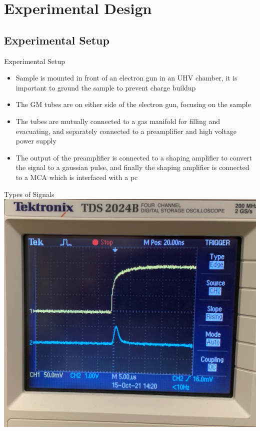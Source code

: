 \documentclass[12pt, aspectratio=169]{beamer}
\begin{document}
\section{Experimental Design}

\subsection{Experimental Setup}
\begin{frame}{Experimental Setup}
    \begin{itemize}
        \item Sample is mounted in front of an electron gun in an UHV chamber, it is important to ground the sample to prevent charge buildup 
        \item The GM tubes are on either side of the electron gun, focusing on the sample
        \item The tubes are mutually connected to a gas manifold for filling and evacuating, and separately connected to a preamplifier and high voltage power supply
        \item The output of the preamplifier is connected to a shaping amplifier to convert the signal to a gaussian pulse, and finally the shaping amplifier is connected to a MCA 
        which is interfaced with a pc
    \end{itemize}
\end{frame}

\begin{frame}{Types of Signals}
    \centering
    \includegraphics[scale=0.14]{Figs/pulses.png}
\end{frame}
\end{document}

